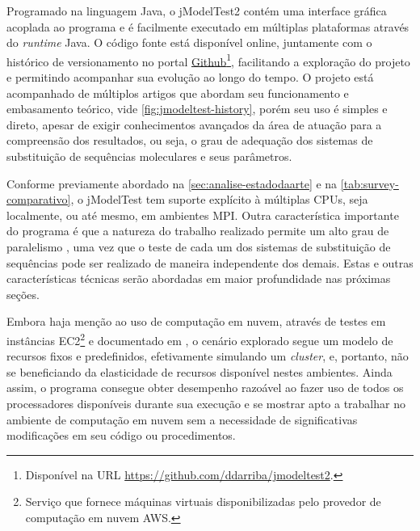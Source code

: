 \documentclass[english,brazilian]{UNISINOSmonografia} %
\begin{document}
{
	\renewcommand*{\thefootnote}{\fnsymbol{footnote}}
	\addtocounter{footnote}{0}
	\renewcommand*{\thefootnote}{\arabic{footnote}}
}


Programado na linguagem Java, o jModelTest2 contém uma interface gráfica acoplada ao programa e é facilmente executado em múltiplas plataformas através do \textit{runtime} Java.
O código fonte está disponível online, juntamente com o histórico de versionamento no portal \href{https://github.com/ddarriba/jmodeltest2}{Github}\footnote{
	Disponível na URL \url{https://github.com/ddarriba/jmodeltest2}.
}, facilitando a exploração do projeto e permitindo acompanhar sua evolução ao longo do tempo.
O projeto está acompanhado de múltiplos artigos que abordam seu funcionamento e embasamento teórico, vide \autoref{fig:jmodeltest-history},
porém seu uso é simples e direto, apesar de exigir conhecimentos avançados da área de atuação para a compreensão dos resultados, ou seja, o grau de adequação dos sistemas de substituição de sequências moleculares e seus parâmetros.



Conforme previamente abordado na \autoref{sec:analise-estadodaarte} e na \autoref{tab:survey-comparativo}, o jModelTest tem suporte explícito à múltiplas CPUs, seja localmente, ou até mesmo, em ambientes MPI.
Outra característica importante do programa é que a natureza do trabalho realizado permite um alto grau de paralelismo \cite{Keane2006a}, uma vez que o teste de cada um dos sistemas de substituição de sequências pode ser realizado de maneira independente dos demais.
Estas e outras características técnicas serão abordadas em maior profundidade nas próximas seções.


Embora haja menção ao uso de computação em nuvem, através de testes em instâncias 
EC2\footnote{
	Serviço que fornece máquinas virtuais disponibilizadas pelo provedor de computação em nuvem AWS.
} 
e documentado em , o cenário explorado segue um modelo de recursos fixos e predefinidos, efetivamente simulando um \textit{cluster}, e, portanto, não se beneficiando da elasticidade de recursos disponível nestes ambientes.
Ainda assim, o programa consegue obter desempenho razoável ao fazer uso de todos os processadores disponíveis durante sua execução e se mostrar apto a trabalhar no ambiente de computação em nuvem sem a necessidade de significativas modificações em seu código ou procedimentos.
\end{document}
